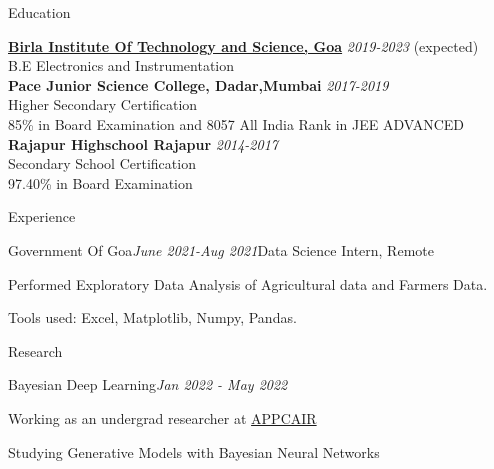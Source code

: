 \documentclass{resume} %
\begin{document}

\begin{rSection}{Education}

{\bf \href{https://www.bits-pilani.ac.in/goa/}{Birla Institute Of Technology and Science, Goa}} \hfill {\em 2019-2023} (expected) \\ 
B.E Electronics and Instrumentation\\


{\bf {Pace Junior Science College, Dadar,Mumbai}} \hfill {\em 2017-2019}\\
Higher Secondary Certification\\
85\% in Board Examination and 8057 All India Rank in JEE ADVANCED \\

{\bf Rajapur Highschool Rajapur} \hfill  {\em 2014-2017} \\ 
Secondary School Certification \\ 
97.40\% in Board Examination 

\end{rSection}

\begin{rSection}{Experience}

\begin{rSubsection}{Government Of Goa}{\em June 2021-Aug 2021}{Data Science Intern, Remote}{}
    
\item Performed Exploratory Data Analysis of Agricultural data and Farmers Data.
\item Tools used: Excel, Matplotlib, Numpy, Pandas.
\end{rSubsection}
\end{rSection}

\begin{rSection}{Research}

\begin{rSubsection}{Bayesian Deep Learning}{\em Jan 2022 - May 2022}{}{}
\item Working as an undergrad researcher at \href{https://www.bits-pilani.ac.in/appcair/}{APPCAIR}
\item Studying Generative Models with Bayesian Neural Networks
\end{rSubsection}
\end{rSection}
\end{document}
